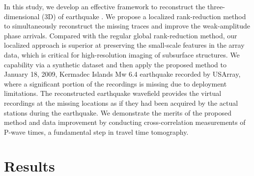In this study, we develop an effective framework to reconstruct the three-dimensional (3D)  of  earthquake . We propose a localized rank-reduction method to simultaneously reconstruct the missing traces and improve the weak-amplitude phase arrivals. Compared with the regular global rank-reduction method, our localized approach is superior at preserving the small-scale features in the array data, which is critical for high-resolution imaging of subsurface structures. We    capability via a synthetic dataset and then apply the proposed method to January 18, 2009, Kermadec Islands Mw 6.4  earthquake recorded by USArray, where a significant portion of the recordings is missing due to deployment limitations.  The  reconstructed earthquake wavefield provides the virtual recordings at the missing locations as if they had been acquired by the actual stations during the earthquake. We demonstrate the merits of the proposed method and data improvement by conducting cross-correlation measurements of  P-wave  times, a fundamental step in  travel time tomography. 

\section*{Results}
